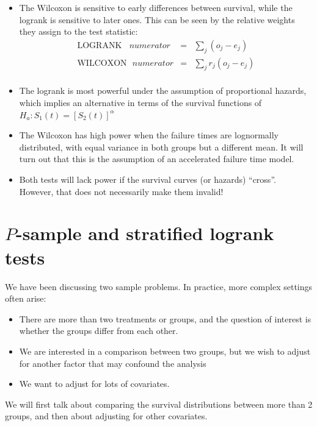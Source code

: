 \documentclass[11pt,slidesonly,semrot,portrait,palatino]{book}
\begin{document}
{\begin{itemize}
\item The Wilcoxon is sensitive to early differences between survival,
while the logrank is sensitive to later ones.  This can be seen by
the relative weights they assign to the test statistic:
\begin{eqnarray*}
\mbox{LOGRANK} ~~~~ numerator & = & \sum_j (o_j - e_j)\\[1ex]
\mbox{WILCOXON} ~~~ numerator & = & \sum_j r_j (o_j - e_j)\\
\end{eqnarray*}

\item The logrank is most powerful under the assumption of
proportional hazards, which implies an alternative in terms
of the survival functions of $H_a: S_1(t)=[S_2(t)]^{\alpha}$

\item The Wilcoxon has high power when the failure times are
lognormally distributed, with equal variance in both groups but a
different mean.  It will turn out that this is the assumption of
an accelerated failure time model.

\item  Both tests will lack power if the survival curves
(or hazards) ``cross''.  However, that does not necessarily
make them invalid!
\end{itemize}
\section{$P$-sample and stratified logrank tests}
We have been discussing two sample problems.  In practice,
more complex settings often arise:
\begin{itemize}
\item There are more than two treatments or groups, and the question of
 interest is whether the groups differ from each other.
\item We are interested in a comparison between  two groups, but we
wish to adjust for another factor that may confound  the analysis
\item We want to adjust for lots of covariates.
\end{itemize}
We will first talk about comparing the survival distributions
between more than 2 groups, and then about adjusting for other
covariates.

}
\end{document}
